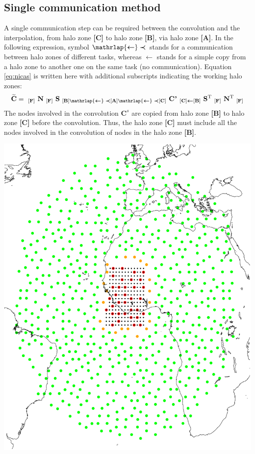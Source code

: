 \documentclass[12pt]{scrartcl}
\begin{document}
\subsection{Single communication method}
A single communication step can be required between the convolution and the interpolation, from halo zone \textbf{[C]} to halo zone \textbf{[B]}, via halo zone \textbf{[A]}. In the following expression, symbol $\mathrlap{\boldsymbol{\leftarrow}}\boldsymbol{\prec}$ stands for a communication between halo zones of different tasks, whereas $\boldsymbol{\leftarrow}$ stands for a simple copy from a halo zone to another one on the same task (no communication). Equation \ref{eq:nicas} is written here with additional subscripts indicating the working halo zones:
\begin{align}
\widetilde{\mathbf{C}} = \ _{\mathbf{[F]}} \ \mathbf{N} \ _{\mathbf{[F]}} \ \mathbf{S} \ _{\mathbf{[B]} \text{$\mathrlap{\boldsymbol{\leftarrow}}\boldsymbol{\prec}$} \mathbf{[A]} \text{$\mathrlap{\boldsymbol{\leftarrow}}\boldsymbol{\prec}$} \mathbf{[C]}} \ \mathbf{C}^s \ _{\mathbf{[C]} \boldsymbol{\leftarrow} \mathbf{[B]}} \ \mathbf{S}^{\mathrm{T}} \ _{\mathbf{[F]}} \ \mathbf{N}^{\mathrm{T}} \ _{\mathbf{[F]}}
\end{align}
The nodes involved in the convolution $\mathbf{C}^s$ are copied from halo zone \textbf{[B]} to halo zone \textbf{[C]} before the convolution. Thus, the halo zone \textbf{[C]} must include all the nodes involved in the convolution of nodes in the halo zone \textbf{[B]}.

\begin{center}
\includegraphics[height=0.6\linewidth]{arp_6B60_halo_1.pdf}
\end{center}
\end{document}
